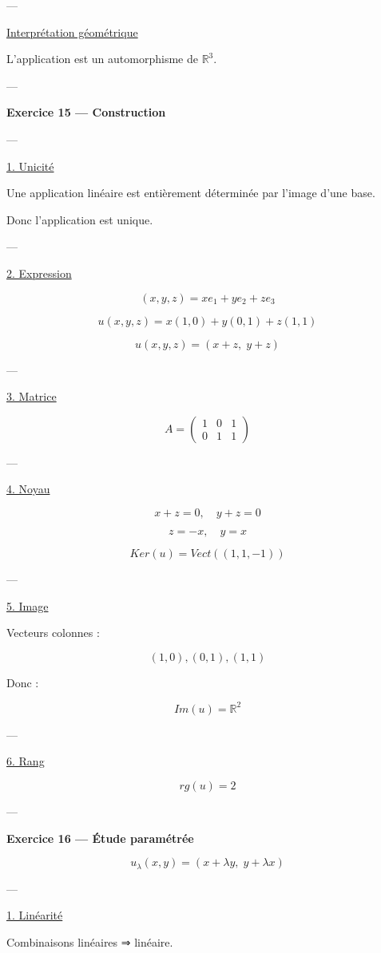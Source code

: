 \documentclass[11pt,a4paper]{article}
\begin{document}
---

\underline{Interprétation géométrique}

L’application est un automorphisme de $\mathbb{R}^3$.

---

\textbf{Exercice 15 — Construction}

---

\underline{1. Unicité}

Une application linéaire est entièrement déterminée par l’image d’une base.

Donc l’application est unique.

---

\underline{2. Expression}

\[
(x,y,z)=x e_1 + y e_2 + z e_3
\]

\[
u(x,y,z)=x(1,0)+y(0,1)+z(1,1)
\]

\[
\boxed{u(x,y,z)=(x+z,\; y+z)}
\]

---

\underline{3. Matrice}

\[
A =
\begin{pmatrix}
1 & 0 & 1 \\
0 & 1 & 1
\end{pmatrix}
\]

---

\underline{4. Noyau}

\[
x+z=0,\quad y+z=0
\]

\[
z=-x,\quad y=x
\]

\[
\boxed{Ker(u)=Vect((1,1,-1))}
\]

---

\underline{5. Image}

Vecteurs colonnes :

\[
(1,0), (0,1), (1,1)
\]

Donc :

\[
\boxed{Im(u)=\mathbb{R}^2}
\]

---

\underline{6. Rang}

\[
\boxed{rg(u)=2}
\]

---

\textbf{Exercice 16 — Étude paramétrée}

\[
u_\lambda(x,y)=(x+\lambda y,\; y+\lambda x)
\]

---

\underline{1. Linéarité}

Combinaisons linéaires ⇒ linéaire.
\end{document}
